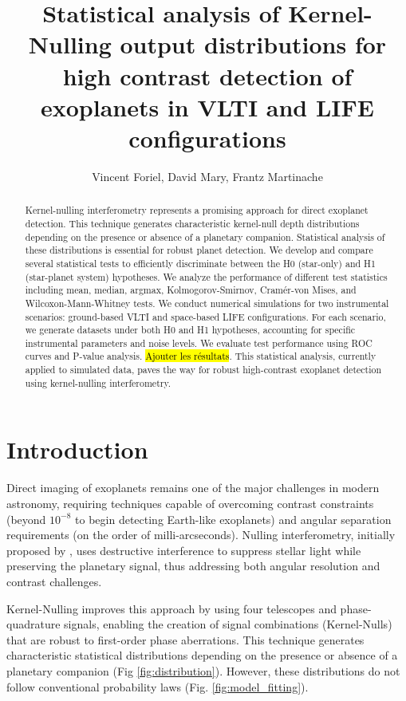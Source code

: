 \documentclass{article}
\title{Statistical analysis of Kernel-Nulling output distributions for high contrast detection of exoplanets in VLTI and LIFE configurations}
\author{Vincent Foriel,
        David Mary,
        Frantz Martinache
       }
\begin{document}
\maketitle

\begin{abstract}
Kernel-nulling interferometry represents a promising approach for direct exoplanet detection. This technique generates characteristic kernel-null depth distributions depending on the presence or absence of a planetary companion. Statistical analysis of these distributions is essential for robust planet detection. We develop and compare several statistical tests to efficiently discriminate between the H0 (star-only) and H1 (star-planet system) hypotheses. We analyze the performance of different test statistics including mean, median, argmax, Kolmogorov-Smirnov, Cramér-von Mises, and Wilcoxon-Mann-Whitney tests. We conduct numerical simulations for two instrumental scenarios: ground-based VLTI and space-based LIFE configurations. For each scenario, we generate datasets under both H0 and H1 hypotheses, accounting for specific instrumental parameters and noise levels. We evaluate test performance using ROC curves and P-value analysis. \hl{Ajouter les résultats}. This statistical analysis, currently applied to simulated data, paves the way for robust high-contrast exoplanet detection using kernel-nulling interferometry.
\end{abstract}


\section{Introduction}

Direct imaging of exoplanets remains one of the major challenges in modern astronomy, requiring techniques capable of overcoming contrast constraints (beyond $10^{-8}$ to begin detecting Earth-like exoplanets) and angular separation requirements (on the order of milli-arcseconds). Nulling interferometry, initially proposed by \cite{Bracewell1979}, uses destructive interference to suppress stellar light while preserving the planetary signal, thus addressing both angular resolution and contrast challenges.

Kernel-Nulling \cite{Martinache2018} improves this approach by using four telescopes and phase-quadrature signals, enabling the creation of signal combinations (Kernel-Nulls) that are robust to first-order phase aberrations. This technique generates characteristic statistical distributions depending on the presence or absence of a planetary companion (Fig \ref{fig:distribution}). However, these distributions do not follow conventional probability laws (Fig. \ref{fig:model_fitting}).
\end{document}
